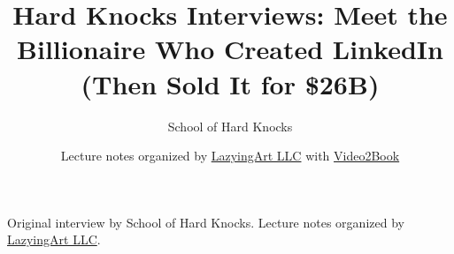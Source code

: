 \documentclass[11pt,oneside]{book}
\begin{document}
\frontmatter
\title{Hard Knocks Interviews: Meet the Billionaire Who Created LinkedIn (Then Sold It for \$26B)}
\author{School of Hard Knocks}
\date{Lecture notes organized by \href{https://lazying.art}{LazyingArt LLC} with \href{https://github.com/lachlanchen/Video2Book}{Video2Book}}
\maketitle
\begin{center}
\small Original interview by School of Hard Knocks. Lecture notes organized by \href{https://lazying.art}{LazyingArt LLC}.
\end{center}
\clearpage
\mainmatter

\end{document}
